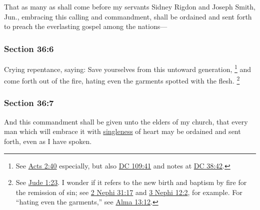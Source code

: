 		That as many as shall come before my servants Sidney Rigdon and Joseph Smith, Jun., embracing this calling and commandment, shall be ordained and sent forth to preach the everlasting gospel among the nations---


	\subsubsection{Section 36:6} %
		\label{DC36-6}

		Crying repentance, saying: Save yourselves from this untoward generation,%
			\footnote{%
				See \hyperref[ACTS-2-40]{Acts 2:40} especially, but also \hyperref[DC109-41]{DC 109:41} and notes at \hyperref[DC38-42]{DC 38:42}.
				}
		and come forth out of the fire, hating even the garments spotted with the flesh.%
			\footnote{%
				See \hyperref[JUDE-1-23]{Jude 1:23}. I wonder if it refers to the new birth and baptism by fire for the remission of sin; see \hyperref[2NEPHI-31-17]{2 Nephi 31:17} and \hyperref[3NEPHI-12-2]{3 Nephi 12:2}, for example. For ``hating even the garments,'' see \hyperref[ALMA-13-12]{Alma 13:12}.
				}


	\subsubsection{Section 36:7} %
		\label{DC36-7}

		And this commandment shall be given unto the elders of my church, that every man which will embrace it with \hyperref[SINGLE]{singleness} of heart may be ordained and sent forth, even as I have spoken.


